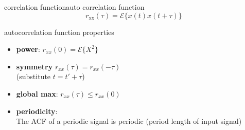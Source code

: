 \begin{frame}{correlation function}{auto correlation function}
		\begin{equation}
			r_\mathrm{xx}(\tau)=\mathcal{E}\lbrace x(t)x(t+\tau)\rbrace  
		\end{equation}

		\pause
		\begin{block}{autocorrelation function properties}
			\begin{itemize}
				\item	\textbf{power}: $r_{xx}(0) = 	\mathcal{E}\lbrace X^2\rbrace $ 

				\pause
				\item	\textbf{symmetry} $r_{xx}(\tau)=r_{xx}(-\tau)$\\
					(substitute $t=t'+\tau$)

				\pause
				\item	\textbf{global max}: $r_{xx}(\tau)\leq r_{xx}(0)$ 

				\pause
				\item	\textbf{periodicity}:\\
					The {ACF} of a periodic signal is periodic (period length of input signal)

			\end{itemize}	
		\end{block}
\end{frame}	

